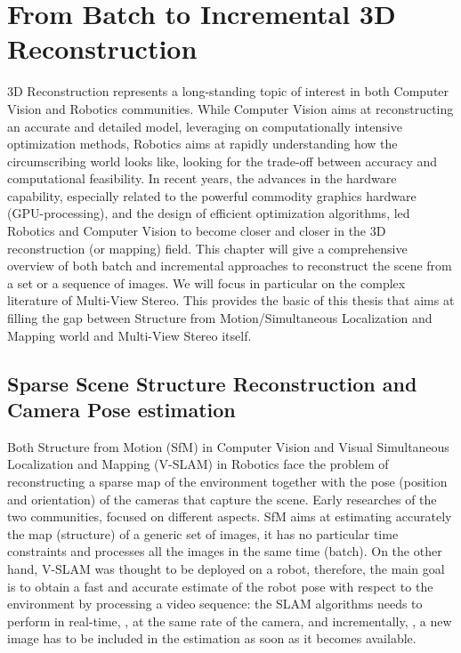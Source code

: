 \chapter{From Batch to Incremental 3D Reconstruction}

3D Reconstruction represents a long-standing topic of interest in both Computer Vision and Robotics communities. 
While Computer Vision aims at reconstructing an accurate and detailed model, leveraging on computationally intensive optimization methods, Robotics aims at rapidly understanding how the circumscribing world looks like, looking for the trade-off between accuracy and computational feasibility.
In recent years, the advances in the hardware capability, especially related to the powerful commodity graphics hardware (GPU-processing), and the design of efficient optimization algorithms, led Robotics and Computer Vision to become closer and closer in the 3D reconstruction (or mapping) field.
This chapter will give a comprehensive overview of both batch and incremental approaches to reconstruct the scene from a set or a sequence of images. We will focus in particular on the complex literature of Multi-View Stereo. This provides the basic of this thesis that aims at filling the gap between Structure from Motion/Simultaneous Localization and Mapping world and Multi-View Stereo itself. 

\minitoc


\section{Sparse Scene Structure Reconstruction and Camera Pose estimation}
\label{sec:slam}
Both Structure from Motion (SfM) in Computer Vision and Visual Simultaneous Localization and Mapping (V-SLAM) in Robotics face the problem of reconstructing a sparse map of the environment together with the pose (position and orientation) of the cameras that capture the scene.
Early researches of the two communities, focused on different aspects.
SfM aims at estimating accurately the map (structure) of a generic set of images, it has no particular time constraints and processes all the images in the same time (batch).
On the other hand, V-SLAM was thought to be deployed on a robot, therefore, the main goal is to obtain a fast and accurate estimate of the robot pose with respect to the environment by processing a video sequence: the SLAM algorithms needs to perform in real-time, \ie, at the same rate of the camera, and incrementally, \ie, a new image  has to be included in the estimation as soon as it becomes available.


